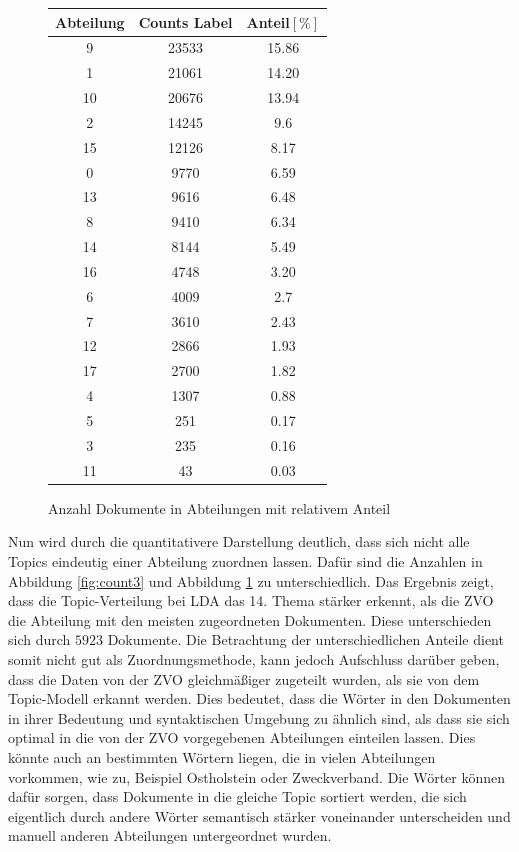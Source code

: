 \documentclass[german,version-2020-11]{uzl-thesis}
\begin{document}
\begin{figure}[H]
\begin{center}
\begin{tabular}{ccc}
\hline
\hline
Abteilung & Counts Label & Anteil$[\%]$\\
\hline
9&23533&15.86\\
1&21061&14.20\\
10&20676&13.94\\
2&14245&9.6\\
15&12126&8.17\\
0&9770&6.59\\
13&9616&6.48\\
8&9410&6.34\\
14&8144&5.49\\
16&4748&3.20\\
6&4009&2.7\\
7&3610&2.43\\
12&2866&1.93\\
17&2700&1.82\\
4&1307&0.88\\
5&251& 0.17\\
3&235&0.16\\
11&43&0.03\\
\hline
\hline
\end{tabular}
\caption{Anzahl Dokumente in Abteilungen mit relativem Anteil}
\label{fig:count4}
\end{center}
\end{figure}


Nun wird durch die quantitativere Darstellung deutlich, dass sich nicht alle Topics eindeutig einer Abteilung zuordnen lassen. Dafür sind die Anzahlen in Abbildung \ref{fig:count3} und Abbildung \ref{fig:count4} zu unterschiedlich. Das Ergebnis zeigt, dass die Topic-Verteilung bei LDA das 14. Thema stärker erkennt, als die ZVO die Abteilung mit den meisten zugeordneten Dokumenten. Diese unterschieden sich durch $5923$ Dokumente. Die Betrachtung der unterschiedlichen Anteile dient somit nicht gut als Zuordnungsmethode, kann jedoch Aufschluss darüber geben, dass die Daten von der ZVO gleichmäßiger zugeteilt wurden, als sie von dem Topic-Modell erkannt werden. Dies bedeutet, dass die Wörter in den Dokumenten in ihrer Bedeutung und syntaktischen Umgebung zu ähnlich sind, als dass sie sich optimal in die von der ZVO vorgegebenen Abteilungen einteilen lassen. Dies könnte auch an bestimmten Wörtern liegen, die in vielen Abteilungen vorkommen, wie zu, Beispiel Ostholstein oder Zweckverband. Die Wörter können dafür sorgen, dass Dokumente in die gleiche Topic sortiert werden, die sich eigentlich durch andere Wörter semantisch stärker voneinander unterscheiden und manuell anderen Abteilungen untergeordnet wurden.\\ 
\end{document}
